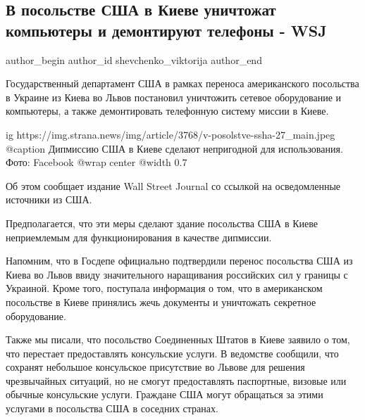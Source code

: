  
 
 
 
 
 
\subsection{В посольстве США в Киеве уничтожат компьютеры и демонтируют телефоны - WSJ}
\label{sec:14_02_2022.stz.news.ua.strana.3.posolstvo_usa_telefony_kompjutery}
 
\ifcmt
 author_begin
   author_id shevchenko_viktorija
 author_end
\fi

Государственный департамент США в рамках переноса американского посольства в
Украине из Киева во Львов постановил уничтожить сетевое оборудование и
компьютеры, а также демонтировать телефонную систему миссии в Киеве.

\ifcmt
  ig https://img.strana.news/img/article/3768/v-posolstve-ssha-27_main.jpeg
  @caption Дипмиссию США в Киеве сделают непригодной для использования. Фото: Facebook
	@wrap center
	@width 0.7
\fi

Об этом сообщает издание Wall Street Journal со ссылкой на осведомленные
источники из США.

Предполагается, что эти меры сделают здание посольства США в Киеве неприемлемым
для функционирования в качестве дипмиссии.

Напомним, что в Госдепе официально подтвердили перенос посольства США из Киева
во Львов ввиду значительного наращивания российских сил у границы с Украиной.
Кроме того, поступала информация о том, что в американском посольстве в Киеве
принялись жечь документы и уничтожать секретное оборудование.

Также мы писали, что посольство Соединенных Штатов в Киеве заявило о том, что
перестает предоставлять консульские услуги. В ведомстве сообщили, что сохранят
небольшое консульское присутствие во Львове для решения чрезвычайных ситуаций,
но не смогут предоставлять паспортные, визовые или обычные консульские услуги.
Граждане США могут обращаться за этими услугами в посольства США в соседних
странах. 

